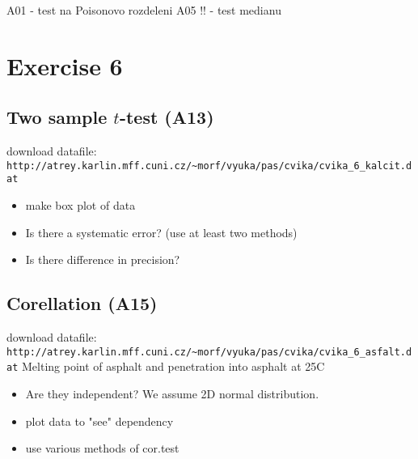 \documentclass[4pt]{article}
\def\answer#1{}
\begin{document}
A01 - test na Poisonovo rozdeleni
A05 !! - test medianu

\pagebreak

\noindent
\pagebreak


\section{Exercise 6}

\subsection{Two sample $t$-test (A13)}
download datafile: \verb'http://atrey.karlin.mff.cuni.cz/~morf/vyuka/pas/cvika/cvika_6_kalcit.dat'

\begin{itemize}
 \item make box plot of data
 \item Is there a systematic error?  (use at least two methods)
 \item Is there difference in precision?
\end{itemize}


\subsection{Corellation (A15)}
download datafile: \verb'http://atrey.karlin.mff.cuni.cz/~morf/vyuka/pas/cvika/cvika_6_asfalt.dat'
Melting point of asphalt and penetration into asphalt at 25\textdegree C

\begin{itemize}
 \item Are they independent? We assume 2D normal distribution.

 \item plot data to "see" dependency
 \item use various methods of cor.test
\end{itemize}
\end{document}
